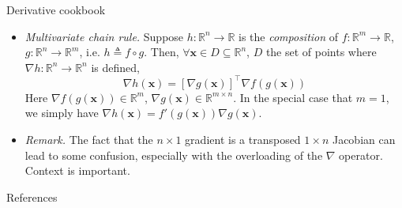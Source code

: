 \documentclass{beamer}
\numberwithin{equation}{section}
\begin{document}
\begin{frame}{Derivative cookbook}
    \begin{itemize}
        \item
        \textit{Multivariate chain rule.} Suppose $ h : \mathbb{R}^n
        \rightarrow \mathbb{R} $ is the \textit{composition} of $ f :
        \mathbb{R}^m \rightarrow \mathbb{R} $, $ g : \mathbb{R}^n
        \rightarrow \mathbb{R}^m $, i.e. $ h \triangleq f \circ g $. Then,
        $ \forall \mathbf{x} \in D \subseteq \mathbb{R}^n $, $ D $ the set of
        points where $ \nabla h : \mathbb{R}^n \rightarrow \mathbb{R}^n $ is
        defined,
        \begin{equation*}
            \nabla h(\mathbf{x}) = [\nabla g(\mathbf{x})]^\top\nabla f(g(\mathbf{x}))
        \end{equation*}
        Here $ \nabla f(g(\mathbf{x})) \in \mathbb{R}^m $,
        $ \nabla g(\mathbf{x}) \in \mathbb{R}^{m \times n} $.
        In the special case that $ m = 1 $, we simply have
        $ \nabla h(\mathbf{x}) = f'(g(\mathbf{x}))\nabla g(\mathbf{x}) $.

        \item
        \textit{Remark.} The fact that the $ n \times 1 $ gradient is a
        transposed $ 1 \times n $ Jacobian can lead to some confusion,
        especially with the overloading of the $ \nabla $ operator. Context
        is important.
    \end{itemize}
\end{frame}

\begin{frame}{References}
    
    
\end{frame}
\end{document}

